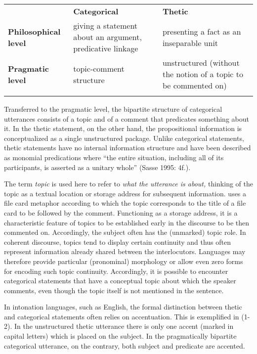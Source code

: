 \documentclass[output=paper]{langsci/langscibook}
\begin{document}
\begin{tabularx}{\textwidth}{XXX} & {\mdseries \textbf{Categorical}} & {\mdseries \textbf{Thetic }}\\
\lsptoprule
{\mdseries \textbf{Philosophical level}} & {\mdseries giving a statement about an argument, predicative linkage } & {\mdseries presenting a fact as an inseparable unit}\\
{\mdseries \textbf{Pragmatic level }} & {\mdseries topic-comment structure\\
} & {\mdseries unstructured (without the notion of a topic to be commented on)}\\
\lspbottomrule
\end{tabularx}
Transferred to the pragmatic level, the bipartite structure of categorical utterances consists of a topic and of a comment that predicates something about it. In the thetic statement, on the other hand, the propositional information is conceptualized as a single unstructured package. Unlike categorical statements, thetic statements have no internal information structure and have been described as monomial predications where “the entire situation, including all of its participants, is asserted as a unitary whole” (Sasse 1995: 4f.). 

  The term \textit{topic} is used here to refer to \textit{what the utterance is about,} thinking of the topic as a textual location or storage address for subsequent information. \citet{Reinhart1982} uses a file card metaphor according to which the topic corresponds to the title of a file card to be followed by the comment. Functioning as a storage address, it is a characteristic feature of topics to be established early in the discourse to be then commented on. Accordingly, the subject often has the (unmarked) topic role. In coherent discourse, topics tend to display certain continuity and thus often represent information already shared between the interlocutors. Languages may therefore provide particular (pronominal) morphology or allow even zero forms for encoding such topic continuity. Accordingly, it is possible to encounter categorical statements that have a conceptual topic about which the speaker comments, even though the topic itself is not mentioned in the sentence. 

  In intonation languages, such as English, the formal distinction between thetic and categorical statements often relies on accentuation. This is exemplified in (1-2). In the unstructured thetic utterance there is only one accent (marked in capital letters) which is placed on the subject. In the pragmatically bipartite categorical utterance, on the contrary, both subject and predicate are accented.
\end{document}
